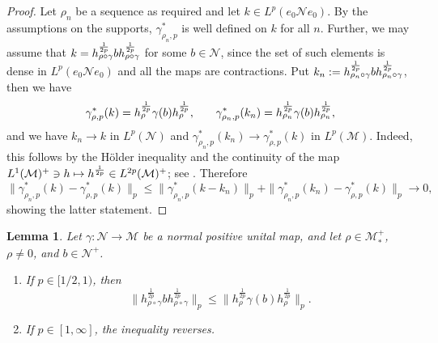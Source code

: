 \documentclass[12pt]{article}
\newtheorem{lemma}[theorem]{Lemma}
\theoremstyle{definition}
\theoremstyle{remark}
\numberwithin{equation}{section}
\def\Me{\mathcal M}
\def\Ne{\mathcal N}
\begin{document}
\begin{proof}
Let $\rho_n$ be a sequence as required and let $k\in L^p(e_0 \Ne e_0)$. By the
assumptions on the supports, $\gamma^*_{\rho_n,p}$ is well defined on $k$ for all $n$.
Further, we may assume that $k=h_{\rho\circ\gamma}^{1\over 2p}b
h_{\rho\circ\gamma}^{1\over 2p}$ for some $b\in \Ne$, since the set of such elements is
dense in $L^p(e_0 \Ne e_0)$ and all the maps are contractions. 
Put $k_n:=h_{\rho_n\circ\gamma}^{1\over 2p}b
h_{\rho_n\circ\gamma}^{1\over 2p}$, then we have
\[
\gamma^*_{\rho,p}(k)={h_\rho^{1\over2p}\gamma(b)h_\rho^{1\over2p},}\qquad
\gamma^*_{\rho_n,p}(k_n)= {h_{\rho_n}^{1\over2p}\gamma(b)h_{\rho_n}^{1\over2p},}
\]
and we have $k_n\to k$ in $L^p(\Ne)$ and  $\gamma^*_{\rho_n,p}(k_n)\to
\gamma^*_{\rho,p}(k)$ in $L^p(\Me)$. Indeed, this follows by the H\"older inequality and the
continuity of the map $L^1(\Me)^+\ni h\mapsto {h^{1\over2p}\in L^{2p}(\Me)^+}$; see
\cite[Lemma 3.4]{kosaki1984applicationsuc}. Therefore
\[
\|\gamma^*_{\rho_n,p}(k)-\gamma^*_{\rho,p}(k)\|_p\le
\|\gamma^*_{\rho_n,p}(k-k_n)\|_p+\|\gamma^*_{\rho_n,p}(k_n)-\gamma^*_{\rho,p}(k)\|_p\to 0,
\]
showing the latter statement.
\end{proof}


\begin{lemma}\label{lemma:dpi} Let $\gamma:\Ne\to \Me$ be a normal positive unital map, and
let $\rho\in \Me_*^+$, {$\rho\ne0$, and} $b\in \Ne^+$. 
\begin{enumerate}
\item[(i)]  If $p\in [1/2,1)$, then 
\[
\Big\|h_{\rho\circ\gamma}^{\frac{1}{2p}}bh_{\rho\circ\gamma}^{\frac{1}{2p}}\Big\|_p\le
\Big\|h_{\rho}^{\frac{1}{2p}}\gamma(b)h_{\rho}^{\frac{1}{2p}}\Big\|_p.
\]

\item[(ii)]  If $p\in [1,\infty]$, the inequality reverses.
\end{enumerate}
\end{lemma}
\end{document}
